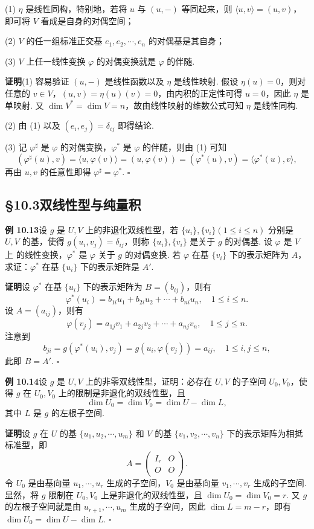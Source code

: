 \documentclass[UTF8, 12pt, fontset=fandol, oneside]{ctexart}
\begin{document}
(1) $\eta$ 是线性同构，特别地，若将 $u$ 与 $(u,-)$ 等同起来，则 $\langle u,v\rangle=(u,v)$，即可将 $V$ 看成是自身的对偶空间；

(2) $V$ 的任一组标准正交基 $e_1,e_2,\cdots,e_n$ 的对偶基是其自身；

(3) $V$ 上任一线性变换 $\varphi$ 的对偶变换就是 $\varphi$ 的伴随.

\noindent\textbf{证明}\quad (1) 容易验证 $(u,-)$ 是线性函数以及 $\eta$ 是线性映射. 假设 $\eta(u)=0$，则对任意的 $v\in V$，$(u,v)=\eta(u)(v)=0$，由内积的正定性可得 $u=0$，因此 $\eta$ 是单映射. 又 $\dim V^*=\dim V=n$，故由线性映射的维数公式可知 $\eta$ 是线性同构.

(2) 由 (1) 以及 $(e_i,e_j)=\delta_{ij}$ 即得结论.

(3) 记 $\varphi^\sharp$ 是 $\varphi$ 的对偶变换，$\varphi^*$ 是 $\varphi$ 的伴随，则由 (1) 可知
\[
(\varphi^\sharp(u),v)=\langle u,\varphi(v)\rangle=(u,\varphi(v))=(\varphi^*(u),v)=\langle\varphi^*(u),v\rangle,
\]
再由 $u,v$ 的任意性即得 $\varphi^\sharp=\varphi^*$. $\square$

\subsection*{§10.3\quad 双线性型与纯量积}

\noindent\textbf{例 10.13}\quad 设 $g$ 是 $U,V$ 上的非退化双线性型，若 $\{u_i\},\{v_i\}(1\le i\le n)$ 分别是 $U,V$ 的基，使得 $g(u_i,v_j)=\delta_{ij}$，则称 $\{u_i\},\{v_i\}$ 是关于 $g$ 的对偶基. 设 $\varphi$ 是 $V$ 上
的线性变换，$\varphi^*$ 是 $\varphi$ 关于 $g$ 的对偶变换. 若 $\varphi$ 在基 $\{v_i\}$ 下的表示矩阵为 $A$，求证：$\varphi^*$ 在基 $\{u_i\}$ 下的表示矩阵是 $A'$.

\noindent\textbf{证明}\quad 设 $\varphi^*$ 在基 $\{u_i\}$ 下的表示矩阵为 $B=(b_{ij})$，则有
\[
\varphi^*(u_i)=b_{1i}u_1+b_{2i}u_2+\cdots+b_{ni}u_n,\quad 1\le i\le n.
\]
设 $A=(a_{ij})$，则有
\[
\varphi(v_j)=a_{1j}v_1+a_{2j}v_2+\cdots+a_{nj}v_n,\quad 1\le j\le n.
\]
注意到
\[
b_{ji}=g(\varphi^*(u_i),v_j)=g(u_i,\varphi(v_j))=a_{ij},\quad 1\le i,j\le n,
\]
此即 $B=A'$. $\square$

\noindent\textbf{例 10.14}\quad 设 $g$ 是 $U,V$ 上的非零双线性型，证明：必存在 $U,V$ 的子空间 $U_0,V_0$，使得 $g$ 在 $U_0,V_0$ 上的限制是非退化的双线性型，且
\[
\dim U_0=\dim V_0=\dim U-\dim L,
\]
其中 $L$ 是 $g$ 的左根子空间.

\noindent\textbf{证明}\quad 设 $g$ 在 $U$ 的基 $\{u_1,u_2,\cdots,u_m\}$ 和 $V$ 的基 $\{v_1,v_2,\cdots,v_n\}$ 下的表示矩阵为相抵标准型，即
\[
A=\left(\begin{array}{cc}
I_r & O\\
O & O
\end{array}\right).
\]
令 $U_0$ 是由基向量 $u_1,\cdots,u_r$ 生成的子空间，$V_0$ 是由基向量 $v_1,\cdots,v_r$ 生成的子空间. 显然，将 $g$ 限制在 $U_0,V_0$ 上是非退化的双线性型，且 $\dim U_0=\dim V_0=r$. 又 $g$ 的左根子空间就是由 $u_{r+1},\cdots,u_m$ 生成的子空间，因此 $\dim L=m-r$，即有 $\dim U_0=\dim U-\dim L$. $\square$
\end{document}
